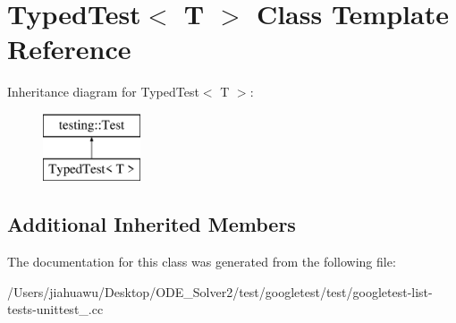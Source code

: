\hypertarget{class_typed_test}{}\section{Typed\+Test$<$ T $>$ Class Template Reference}
\label{class_typed_test}
Inheritance diagram for Typed\+Test$<$ T $>$\+:\begin{figure}[H]
\begin{center}
\leavevmode
\includegraphics[height=2.000000cm]{class_typed_test}
\end{center}
\end{figure}
\subsection*{Additional Inherited Members}


The documentation for this class was generated from the following file\+:\begin{DoxyCompactItemize}
\item 
/\+Users/jiahuawu/\+Desktop/\+O\+D\+E\+\_\+\+Solver2/test/googletest/test/googletest-\/list-\/tests-\/unittest\+\_\+.\+cc\end{DoxyCompactItemize}
